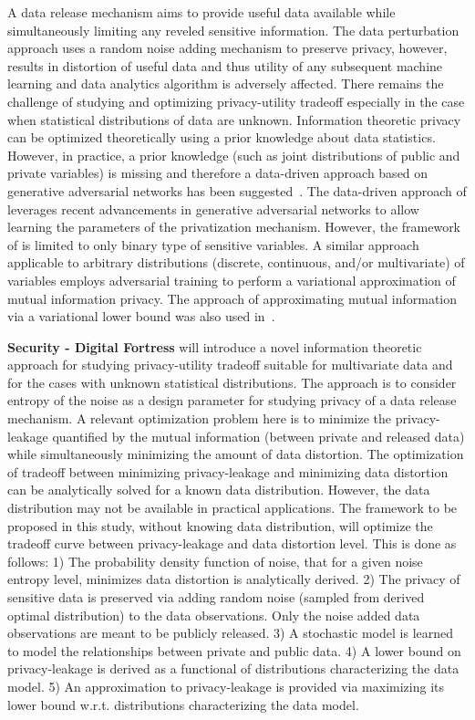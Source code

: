 \documentclass[a4paper,11pt]{article}
\newcommand{\project}[1]{\textbf{#1}\xspace}
\newcommand{\SECURITY}{\project{Security - Digital Fortress}}
\newcommand{\TheProject}{\SECURITY}
\begin{document}
A data release mechanism aims to provide useful data available while simultaneously limiting any reveled sensitive information. The data perturbation approach uses a random noise adding mechanism to preserve privacy, however, results in distortion of useful data and thus utility of any subsequent machine learning and data analytics algorithm is adversely affected. There remains the challenge of studying and optimizing privacy-utility tradeoff especially in the case when statistical distributions of data are unknown. Information theoretic privacy can be optimized theoretically using a prior knowledge about data statistics. However, in practice, a prior knowledge (such as joint distributions of public and private variables) is missing and therefore a data-driven approach based on generative adversarial networks has been suggested~\cite{Huang_2017}. The data-driven approach of \cite{Huang_2017} leverages recent advancements in generative adversarial networks to allow learning the parameters of the privatization mechanism. However, the framework of \cite{Huang_2017} is limited to only binary type of sensitive variables. A similar approach~\cite{8919758} applicable to arbitrary distributions (discrete, continuous, and/or multivariate) of variables employs adversarial training to perform a variational approximation of mutual information privacy. The approach of approximating mutual information via a variational lower bound was also used in~\cite{NIPS2016_6399}.         

\TheProject{} will introduce a novel information theoretic approach for studying privacy-utility tradeoff suitable for multivariate data and for the cases with unknown statistical distributions. The approach is to consider entropy of the noise as a design parameter for studying privacy of a data release mechanism. A relevant optimization problem here is to minimize the privacy-leakage quantified by the mutual information (between private and released data) while simultaneously minimizing the amount of data distortion. The optimization of tradeoff between minimizing privacy-leakage and minimizing data distortion can be analytically solved for a known data distribution. However, the data distribution may not be available in practical applications. The framework to be proposed in this study, without knowing data distribution, will optimize the tradeoff curve between privacy-leakage and data distortion level. This is done as follows: 1) The probability density function of noise, that for a given noise entropy level, minimizes data distortion is analytically derived. 2) The privacy of sensitive data is preserved via adding random noise (sampled from derived optimal distribution) to the data observations. Only the noise added data observations are meant to be publicly released. 3) A stochastic model is learned to model the relationships between private and public data. 4) A lower bound on privacy-leakage is derived as a functional of distributions characterizing the data model. 5) An approximation to privacy-leakage is provided via maximizing its lower bound w.r.t. distributions characterizing the data model.           
\end{document}
